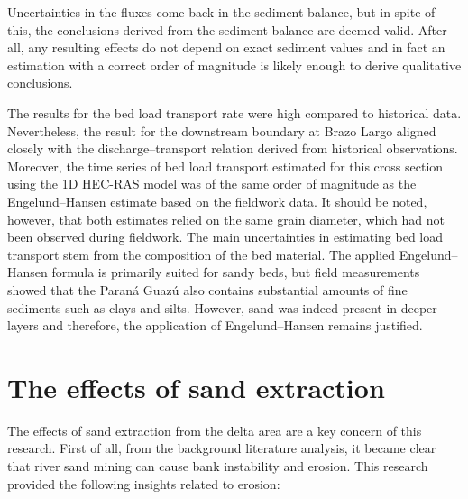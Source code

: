 Uncertainties in the fluxes come back in the sediment balance, but in spite of this, the conclusions derived from the sediment balance are deemed valid. After all, any resulting effects do not depend on exact sediment values and in fact an estimation with a correct order of magnitude is likely enough to derive qualitative conclusions. 

The results for the bed load transport rate were high compared to historical data. Nevertheless, the result for the downstream boundary at Brazo Largo aligned closely with the discharge–transport relation derived from historical observations. Moreover, the time series of bed load transport estimated for this cross section using the 1D HEC-RAS model was of the same order of magnitude as the Engelund–Hansen estimate based on the fieldwork data. It should be noted, however, that both estimates relied on the same grain diameter, which had not been observed during fieldwork. The main uncertainties in estimating bed load transport stem from the composition of the bed material. The applied Engelund–Hansen formula is primarily suited for sandy beds, but field measurements showed that the Paraná Guazú also contains substantial amounts of fine sediments such as clays and silts. However, sand was indeed present in deeper layers and therefore, the application of Engelund–Hansen remains justified.

\section{The effects of sand extraction}
The effects of sand extraction from the delta area are a key concern of this research. First of all, from the background literature analysis, it became clear that river sand mining can cause bank instability and erosion. This research provided the following insights related to erosion:

